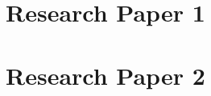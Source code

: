 \chapter{Research Paper 1}\label{[CHAPTER] Appendix:P1}

\chapter{Research Paper 2}\label{[CHAPTER] Appendix:P2}

